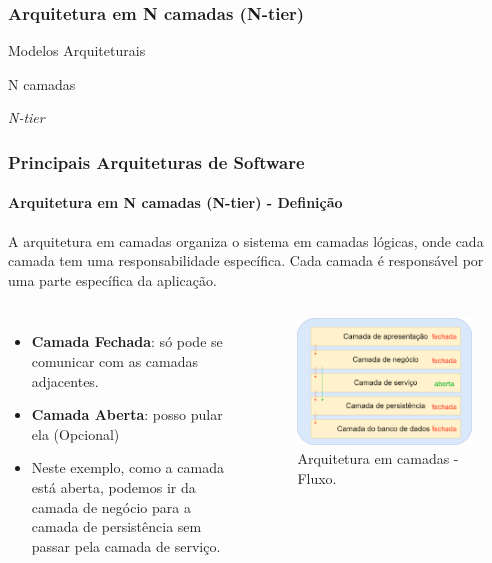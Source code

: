 \documentclass[
	10pt, %
	t, %
]{beamer}
\begin{document}
\subsubsection{Arquitetura em N camadas (N-tier)}

\begin{frame}
	\begin{center}
		
		\bigskip\bigskip\bigskip\bigskip %
		{\Large Modelos Arquiteturais}
		
		\bigskip\bigskip %
		{\Huge N camadas}

		\smallskip
		{\small \textit{N-tier}}
	\end{center}

\end{frame}

\begin{frame}
	\frametitle{Principais Arquiteturas de Software}
	\framesubtitle{Arquitetura em N camadas (N-tier) - Definição}

	A arquitetura em camadas organiza o sistema em camadas lógicas, onde cada camada tem uma responsabilidade específica. Cada camada é responsável por uma parte específica da aplicação.

	\begin{columns}
		\begin{itemize}
			\item {\small \textbf{Camada Fechada}: só pode se comunicar com as camadas adjacentes.}
			\item {\small \textbf{Camada Aberta}: posso pular ela (Opcional)}
			\item {\small Neste exemplo, como a camada está aberta, podemos ir da camada de negócio para a camada de persistência sem passar pela camada de serviço.}
		\end{itemize}
		\begin{figure}
			\centering
			\includegraphics[width=0.9\linewidth]{Images/n-tier-simple-2.png}
			\caption{Arquitetura em camadas - Fluxo.}\label{fig:n-tier-simple-2}
		\end{figure}
	\end{columns}

\end{frame}
\end{document}
